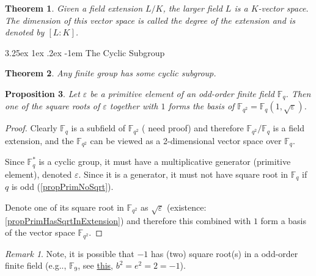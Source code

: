 \documentclass[12pt, letterpaper]{article}
\makeatletter
\newcommand{\field}{\mathbb{F}}
\newcommand\eg{e.g\@ifnextchar.{}{.\@}}
\newcommand{\red}[1]{{\color{red} #1}}
\newtheorem{prop}{Proposition}[section]
\newtheorem{thm}[prop]{Theorem}
\renewcommand\paragraph{\@startsection{paragraph}{4}{\z@}%
	{3.25ex \@plus1ex \@minus.2ex}%
	{-1em}%
	{\normalfont\normalsize\bfseries}}
\theoremstyle{definition}
\theoremstyle{remark}
\newtheorem*{rem*}{Remark}
\theoremstyle{definition}
\theoremstyle{plain}
\numberwithin{equation}{section}
\makeatother
\begin{document}
	\begin{thm}
		Given a field extension $L / K$,
		the larger field $L$ is a $K$-vector space.
		The dimension of this vector space is called the degree of the extension and is denoted by $[L : K]$.
	\end{thm}
	\paragraph{The Cyclic Subgroup}
	\begin{thm}
		Any finite group has some cyclic subgroup.
	\end{thm}

	\begin{prop}
		Let $\varepsilon$ be a primitive element of an odd-order finite field $\field_q$.
		Then one of the square roots of $\varepsilon$ together with $1$ forms the basis of $\field_{q^2}=\field_q(1,\sqrt{\varepsilon})$.
	\end{prop}
	\begin{proof}
		Clearly $\field_q$ is a subfield of $\field_{q^2}$ (\red{need proof})
		and therefore $\field_{q^2}/\field_q$ is a field extension,
		and the $\field_{q^2}$ can be viewed as a 2-dimensional vector space over $\field_q$.
		
		Since $\field_q^*$ is a cyclic group, it must have a multiplicative generator (primitive element), denoted $\varepsilon$.
		Since it is a generator, it must not have square root in $\field_q$ if $q$ is odd (\ref{propPrimNoSqrt}).
		
		Denote one of its square root in $\field_{q^2}$ as $\sqrt{\varepsilon}$ (existence: \ref{propPrimHasSqrtInExtension})
		and therefore this combined with $1$
		form a basis of the vector space $\field_{q^2}$.
	\end{proof}
	\begin{rem*}
		Note, it is possible that $-1$ has (two) square root(s) in a odd-order finite field (\eg, $\field_9$, 
		see \href{https://www.chegg.com/homework-help/questions-and-answers/11-let-f9-finite-field-9-elements-addition-multiplication-tables-f9-given-next-page-descri-q13298041}{this}, $b^2=e^2=2=-1$).
	\end{rem*}
\end{document}
